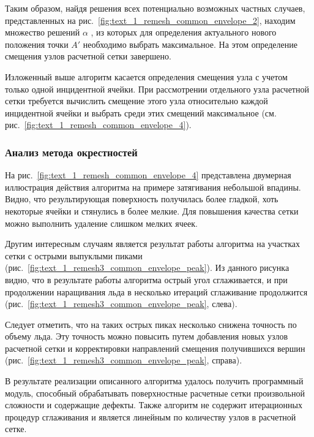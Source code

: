 Таким образом, найдя решения всех потенциально возможных частных случаев, представленных на рис.~\ref{fig:text_1_remesh_common_envelope_2}, находим множество решений $\alpha$ , из которых для определения актуального нового положения точки $A'$ необходимо выбрать максимальное.
На этом определение смещения узлов расчетной сетки завершено.

Изложенный выше алгоритм касается определения смещения узла с учетом только одной инцидентной ячейки.
При рассмотрении отдельного узла расчетной сетки требуется вычислить смещение этого узла относительно каждой инцидентной ячейки и выбрать среди этих смещений максимальное (см. рис.~\ref{fig:text_1_remesh_common_envelope_4}).

\subsubsection{Анализ метода окрестностей}

На рис.~\ref{fig:text_1_remesh_common_envelope_4} представлена двумерная иллюстрация действия алгоритма на примере затягивания небольшой впадины.
Видно, что результирующая поверхность получилась более гладкой, хоть некоторые ячейки и стянулись в более мелкие.
Для повышения качества сетки можно выполнить удаление слишком мелких ячеек.

Другим интересным случаям является результат работы алгоритма на участках сетки с острыми выпуклыми пиками (рис.~\ref{fig:text_1_remesh3_common_envelope_peak}).
Из данного рисунка видно, что в результате работы алгоритма острый угол сглаживается, и при продолжении наращивания льда в несколько итераций сглаживание продолжится (рис.~\ref{fig:text_1_remesh3_common_envelope_peak}, слева).

Следует отметить, что на таких острых пиках несколько снижена точность по объему льда.
Эту точность можно повысить путем добавления новых узлов расчетной сетки и корректировки направлений смещения получившихся вершин (рис.~\ref{fig:text_1_remesh3_common_envelope_peak}, справа).

В результате реализации описанного алгоритма удалось получить программный модуль, способный обрабатывать поверхностные расчетные сетки произвольной сложности и содержащие дефекты.
Также алгоритм не содержит итерационных процедур сглаживания и является линейным по количеству узлов в расчетной сетке.

